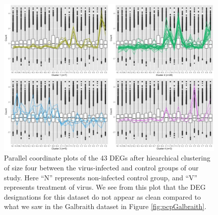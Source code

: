\documentclass[11pt,a4paper,oldfontcommands,openany]{memoir}
\numberwithin{equation}{section} %
\begin{document}
\begin{figure}[H]
\centering
  \includegraphics[width=\textwidth]{../N_V/DESeq2/ClusterStandard/Clustering_data_FDR_05/N_V_4.jpg}
  \caption{Parallel coordinate plots of the 43 DEGs after hiearchical clustering of size four between the virus-infected and control groups of our study. Here ``N'' represents non-infected control group, and ``V'' represents treatment of virus. We see from this plot that the DEG designations for this dataset do not appear as clean compared to what we saw in the Galbraith dataset in Figure \ref{fig:pcpGalbraith}.}
  \label{fig:pcpRutterVirus}
\end{figure}
\end{document}
